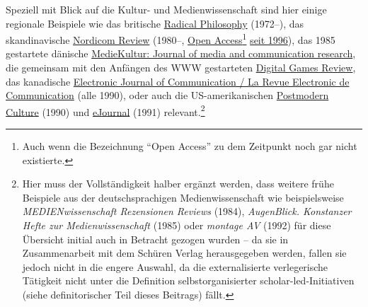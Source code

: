 \documentclass[a4paper,
fontsize=11pt,
oneside,
numbers=noperiodatend,
parskip=half-,
bibliography=totoc,
final
]{scrartcl}
\begin{document}
Speziell mit Blick auf die Kultur- und Medienwissenschaft sind hier
einige regionale Beispiele wie das britische
\href{https://www.radicalphilosophy.com/editorial/founding-statement-frontispiece}{Radical
Philosophy} (1972--), das skandinavische
\href{https://www.nordicom.gu.se/en/publications/nordicom-review/nordicom-review-11996}{Nordicom
Review} (1980--,
\href{https://www.nordicom.gu.se/en/publications/nordicom-review/nordicom-review-11996}{Open
Access}\footnote{Auch wenn die Bezeichnung \enquote{Open Access} zu dem
  Zeitpunkt noch gar nicht existierte.}
\href{https://www.nordicom.gu.se/en/publications/nordicom-review/nordicom-review-11996}{seit
1996}), das 1985 gestartete dänische
\href{https://tidsskrift.dk/mediekultur/}{MedieKultur: Journal of media
and communication research}, die gemeinsam mit den Anfängen des WWW
gestarteten
\href{https://archive.org/details/DGRD_01_zip\%20https://archive.org/search.php?query=creator\%3A\%22Dave\%20Taylor\%22\%20Digital\%20Games\%20Review}{Digital
Games Review}, das kanadische
\href{http://ejcojs.cios.org/index.php/ejc}{Electronic Journal of
Communication / La Revue Electronic de Communication} (alle 1990), oder
auch die US-amerikanischen
\href{http://pmc.iath.virginia.edu/text-only/issue.990/contents.990.html}{Postmodern
Culture} (1990) und
\href{https://web.archive.org/web/20000305174913/http://rachel.albany.edu/~ejournal/v1n1/v1n1.html}{eJournal}
(1991) relevant.\footnote{Hier muss der Vollständigkeit halber ergänzt
  werden, dass weitere frühe Beispiele aus der deutschsprachigen
  Medienwissenschaft wie beispielsweise \emph{MEDIENwissenschaft
  Rezensionen \textbar{} Reviews} (1984), \emph{AugenBlick. Konstanzer
  Hefte zur Medienwissenschaft} (1985) oder \emph{montage AV} (1992) für
  diese Übersicht initial auch in Betracht gezogen wurden -- da sie in
  Zusammenarbeit mit dem Schüren Verlag herausgegeben werden, fallen sie
  jedoch nicht in die engere Auswahl, da die externalisierte
  verlegerische Tätigkeit nicht unter die Definition selbstorganisierter
  scholar-led-Initiativen (siehe definitorischer Teil dieses Beitrags)
  fällt.}
\end{document}
